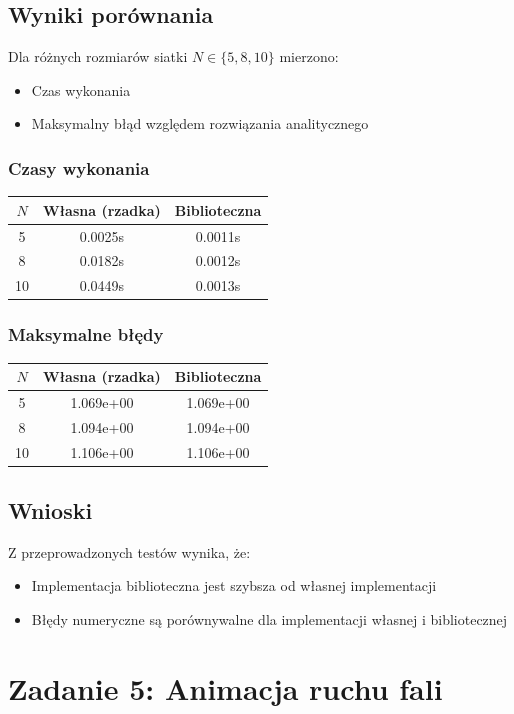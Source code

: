 \documentclass[12pt,a4paper]{article}
\begin{document}
\subsection{Wyniki porównania}
Dla różnych rozmiarów siatki $N \in \{5, 8, 10\}$ mierzono:
\begin{itemize}
    \item Czas wykonania
    \item Maksymalny błąd względem rozwiązania analitycznego
\end{itemize}

\subsubsection{Czasy wykonania}
\begin{tabular}{|c|c|c|}
\hline
$N$ & Własna (rzadka) & Biblioteczna \\
\hline
5 & 0.0025s & 0.0011s \\
\hline
8 & 0.0182s & 0.0012s \\
\hline
10 & 0.0449s & 0.0013s \\
\hline
\end{tabular}

\subsubsection{Maksymalne błędy}
\begin{tabular}{|c|c|c|}
\hline
$N$ & Własna (rzadka) & Biblioteczna \\
\hline
5 & 1.069e+00 & 1.069e+00 \\
\hline
8 & 1.094e+00 & 1.094e+00 \\
\hline
10 & 1.106e+00 & 1.106e+00 \\
\hline
\end{tabular}

\subsection{Wnioski}

Z przeprowadzonych testów wynika, że:
\begin{itemize}
    \item Implementacja biblioteczna jest szybsza od własnej implementacji
    \item Błędy numeryczne są porównywalne dla implementacji własnej i bibliotecznej
\end{itemize}

\section{Zadanie 5: Animacja ruchu fali}
\end{document}
